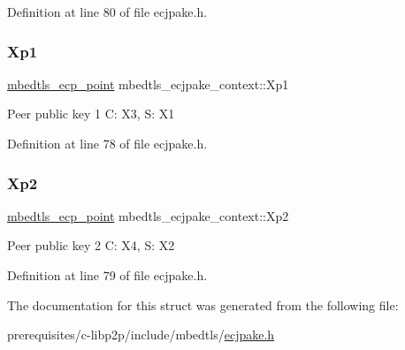 Definition at line 80 of file ecjpake.\+h.

\mbox{\label{structmbedtls__ecjpake__context_a3278c6093f4ef2bfd90984fc3d4cf773}} 
\subsubsection{\texorpdfstring{Xp1}{Xp1}}
{\footnotesize\ttfamily \mbox{\hyperlink{structmbedtls__ecp__point}{mbedtls\+\_\+ecp\+\_\+point}} mbedtls\+\_\+ecjpake\+\_\+context\+::\+Xp1}

Peer public key 1 C\+: X3, S\+: X1 

Definition at line 78 of file ecjpake.\+h.

\mbox{\label{structmbedtls__ecjpake__context_a586f1c91152f57b4398b5e9711b93c46}} 
\subsubsection{\texorpdfstring{Xp2}{Xp2}}
{\footnotesize\ttfamily \mbox{\hyperlink{structmbedtls__ecp__point}{mbedtls\+\_\+ecp\+\_\+point}} mbedtls\+\_\+ecjpake\+\_\+context\+::\+Xp2}

Peer public key 2 C\+: X4, S\+: X2 

Definition at line 79 of file ecjpake.\+h.



The documentation for this struct was generated from the following file\+:\begin{DoxyCompactItemize}
\item 
prerequisites/c-\/libp2p/include/mbedtls/\mbox{\hyperlink{ecjpake_8h}{ecjpake.\+h}}\end{DoxyCompactItemize}
